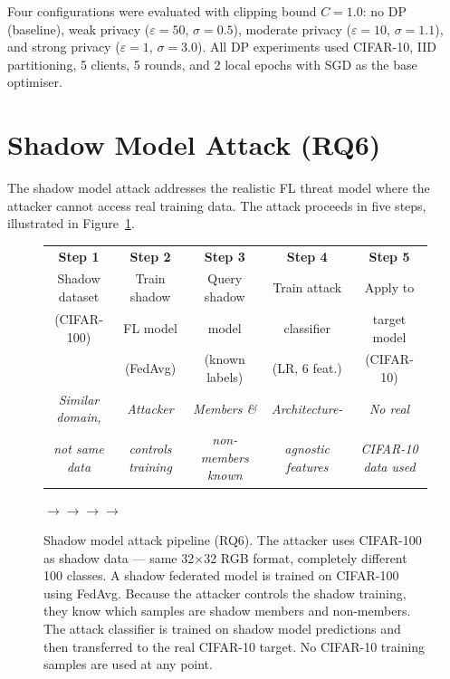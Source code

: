 \documentclass[12pt, a4paper]{report}
\renewcommand{\arraystretch}{1.15}
\begin{document}
Four configurations were evaluated with clipping bound $C = 1.0$: no DP
(baseline), weak privacy ($\varepsilon = 50$, $\sigma = 0.5$), moderate privacy
($\varepsilon = 10$, $\sigma = 1.1$), and strong privacy ($\varepsilon = 1$,
$\sigma = 3.0$). All DP experiments used CIFAR-10,
IID partitioning, 5 clients, 5 rounds, and 2 local epochs with SGD as the base
optimiser.

\section{Shadow Model Attack (RQ6)}

The shadow model attack addresses the realistic FL threat model where the attacker
cannot access real training data. The attack proceeds in five steps, illustrated
in Figure~\ref{fig:shadow_pipeline}.

\begin{figure}[H]
\centering
\renewcommand{\arraystretch}{1.4}
\begin{tabular}{@{}ccccc@{}}
\hline
\cellcolor{tealcolor!15}\textbf{Step 1} &
\cellcolor{tealcolor!15}\textbf{Step 2} &
\cellcolor{tealcolor!15}\textbf{Step 3} &
\cellcolor{tealcolor!15}\textbf{Step 4} &
\cellcolor{tealcolor!15}\textbf{Step 5} \\[4pt]
Shadow dataset & Train shadow & Query shadow & Train attack & Apply to \\
(CIFAR-100) & FL model & model & classifier & target model \\
& (FedAvg) & (known labels) & (LR, 6 feat.) & (CIFAR-10) \\[4pt]
\scriptsize\textit{Similar domain,} &
\scriptsize\textit{Attacker} &
\scriptsize\textit{Members \&} &
\scriptsize\textit{Architecture-} &
\scriptsize\textit{No real} \\
\scriptsize\textit{not same data} &
\scriptsize\textit{controls training} &
\scriptsize\textit{non-members known} &
\scriptsize\textit{agnostic features} &
\scriptsize\textit{CIFAR-10 data used} \\
\hline
\end{tabular}
\vspace{4pt}

\noindent\hspace{0.5cm}$\longrightarrow$\hspace{1.7cm}$\longrightarrow$\hspace{1.7cm}$\longrightarrow$\hspace{1.7cm}$\longrightarrow$
\caption{Shadow model attack pipeline (RQ6). The attacker uses CIFAR-100 as
shadow data --- same 32$\times$32 RGB format, completely different 100 classes.
A shadow federated model is trained on CIFAR-100 using FedAvg. Because the
attacker controls the shadow training, they know which samples are shadow members
and non-members. The attack classifier is trained on shadow model predictions and
then transferred to the real CIFAR-10 target. No CIFAR-10 training samples are
used at any point.}
\label{fig:shadow_pipeline}
\end{figure}
\end{document}
